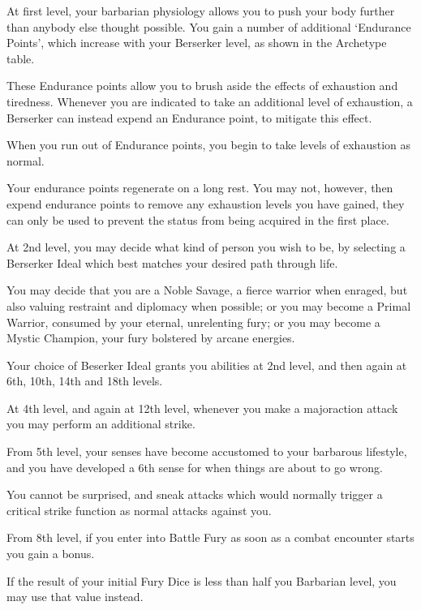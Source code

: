 {
At first level, your barbarian physiology allows you to push your body further than anybody else thought possible. You gain a number of additional `Endurance Points', which increase with your Berserker level, as shown in the Archetype table. 

These Endurance points allow you to brush aside the effects of exhaustion and tiredness. Whenever you are indicated to take an additional level of exhaustion, a Berserker can instead expend an Endurance point, to mitigate this effect. 

When you run out of Endurance points, you begin to take levels of exhaustion as normal. 

Your endurance points regenerate on a long rest. You may not, however, then expend endurance points to remove any exhaustion levels you have gained, they can only be used to prevent the status from being acquired in the first place.
}

{

	At 2nd level, you may decide what kind of person you wish to be, by selecting a Berserker Ideal which best matches your desired path through life. 
	
	You may decide that you are a Noble Savage, a fierce warrior when enraged, but also valuing restraint and diplomacy when possible; or you may become a Primal Warrior, consumed by your eternal, unrelenting fury; or you may become a Mystic Champion, your fury bolstered by arcane energies. 
	
	Your choice of Beserker Ideal grants you abilities at 2nd level, and then again at 6th, 10th, 14th and 18th levels. 
}

{
	At 4th level, and again at 12th level, whenever you make a major\minus{}action attack you may perform an additional strike. 
}

{
	From 5th level, your senses have become accustomed to your barbarous lifestyle, and you have developed a 6th sense for when things are about to go wrong. 

	You cannot be surprised, and sneak attacks which would normally trigger a critical strike function as normal attacks against you. 
}

{
	From 8th level, if you enter into Battle Fury as soon as a combat encounter starts you gain a bonus. 
	
	If the result of your initial Fury Dice is less than half you Barbarian level, you may use that value instead. 
}

